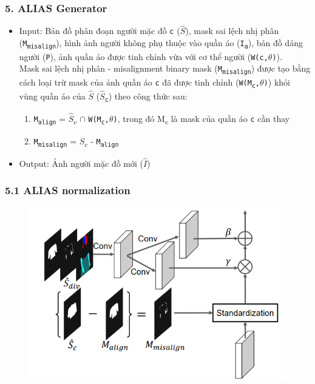 \documentclass{beamer}
\begin{document}
\begin{frame}
\frametitle{5. ALIAS Generator}
\begin{itemize}
    \item Input: Bản đồ phân đoạn người mặc đồ \texttt{c} ($\hat{S}$), mask sai lệch nhị phân (\texttt{M\textsubscript{misalign}}), hình ảnh người không phụ thuộc vào quần áo (\texttt{I\textsubscript{a}}), bản đồ dáng người (\texttt{P}), ảnh quần áo được tinh chỉnh vừa với cơ thể người (\texttt{W(c,$\theta$)}).
    \\Mask sai lệch nhị phân - misalignment binary mask (\texttt{M\textsubscript{misalign}}) được tạo bằng cách loại trừ mask của ảnh quần áo \texttt{c} đã được tinh chỉnh (\texttt{W(M\textsubscript{c},$\theta$)}) khỏi vùng quần áo của $\hat{S}$ (\texttt{$\hat{S}$\textsubscript{c}}) theo công thức sau:
    \begin{enumerate}
        \item \texttt{M\textsubscript{align}} = $\hat{S}$\textsubscript{c} $\cap$ \texttt{W(M\textsubscript{c},$\theta$)}, trong đó M\textsubscript{c} là mask của quần áo \texttt{c} cần thay
        \item \texttt{M\textsubscript{misalign}} = $\hat{S}$\textsubscript{c} - \texttt{M\textsubscript{align}}
    \end{enumerate}
    \par
    \item Output: Ảnh người mặc đồ mới ($\hat{I}$)
\end{itemize}
\end{frame}

\begin{frame}
\frametitle{5.1 ALIAS normalization}

\begin{figure}
    \centering
    \includegraphics[width=1\linewidth]{alias_n.png}
    
    
\end{figure}

\end{frame}
\end{document}
